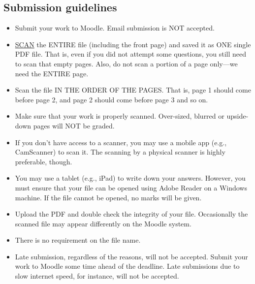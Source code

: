 \documentclass[letterpaper,11pt,addpoints]{exam}
\begin{document}
\subsection*{Submission guidelines}
\begin{itemize}
\item Submit your work to Moodle. Email submission is NOT accepted. 
\item \underline{SCAN} the ENTIRE file (including the front page) and saved it as ONE single PDF file. That is, even if you did not attempt some questions, you still need to scan that empty pages. Also, do not scan a portion of a page only---we need the ENTIRE page. 
\item Scan the file IN THE ORDER OF THE PAGES. That is, page 1 should come before page 2, and page 2 should come before page 3 and so on. 
\item Make sure that your work is properly scanned. Over-sized, blurred or upside-down pages will NOT be graded.
\item If you don’t have access to a scanner, you may use a mobile app (e.g., CamScanner) to scan it. The scanning by a physical scanner is highly preferable, though.  
\item You may use a tablet (e.g., iPad) to write down your answers. However, you must ensure that your file can be opened using Adobe Reader on a Windows machine. If the file cannot be opened, no marks will be given. %

\item Upload the PDF and double check the integrity of your file. Occasionally the scanned file may appear differently on the Moodle system.
\item There is no requirement on the file name. 
\item Late submission, regardless of the reasons, will not be accepted. Submit your work to Moodle some time ahead of the deadline. Late submissions due to slow internet speed, for instance, will not be accepted.
\end{itemize}



\end{document}
